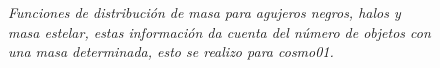 \begin{figure}
\centering
{}
\caption{\emph{Funciones de distribución de masa para agujeros negros, halos y masa estelar, estas información da cuenta del número de objetos con una masa determinada, esto se realizo para {\it{cosmo01}}. }}
 \label{fig: Funciones de masa cosmo01}
\end{figure}
